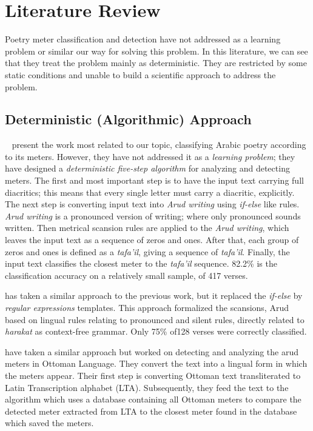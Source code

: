\chapter{Literature Review}\label{Ch:Literature}

Poetry meter classification and detection have not addressed as a learning problem or similar our way for solving this problem. In this literature, we can see that they treat the problem mainly as deterministic. They are restricted by some static conditions and unable to build a scientific approach to address the problem.

%
\section{Deterministic (Algorithmic) Approach}\label{sec:Determ_Algor_Appr}


~\cite{Abuata2016RuleBasedAlgorithm} present the work most related to our topic, classifying Arabic poetry according to its meters. However, they have not addressed it as a \textit{learning problem}; they have designed a \textit{deterministic five-step algorithm} for analyzing and detecting meters. The first and most important step is to have the input text carrying full diacritics; this means that every single letter must carry a diacritic, explicitly. The next step is converting input text into \textit{Arud writing} using \textit{if-else} like rules. \textit{Arud writing} is a pronounced version of writing; where only pronounced sounds written. Then metrical scansion rules are applied to the \textit{Arud writing}, which leaves the input text as a sequence of zeros and ones. After that, each group of zeros and ones is defined as a \textit{tafa'il}, giving a sequence of \textit{tafa'il}. Finally, the input text classifies the closest meter to the \textit{tafa'il} sequence. 82.2\% is the classification accuracy on a relatively small sample, of 417 verses.

\cite{Alnagdawi2013FindingArabicPoemMeter} has taken a similar approach to the previous work, but it replaced the \textit{if-else} by \textit{regular expressions} templates. This approach formalized the scansions, Arud based on lingual rules relating to pronounced and silent rules, directly related to \textit{harakat} as context-free grammar. Only 75\% of128 verses were correctly classified. 

\cite{Kurt2012AlgorithmForDetectionAnalysis} have taken a similar approach but worked on detecting and analyzing the arud meters in Ottoman Language. They convert the text into a lingual form in which the meters appear. Their first step is converting Ottoman text transliterated to Latin Transcription alphabet (LTA). Subsequently, they feed the text to the algorithm which uses a database containing all Ottoman meters to compare the detected meter extracted from LTA to the closest meter found in the database which saved the meters.


